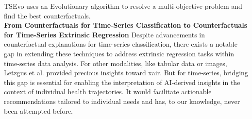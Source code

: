  TSEvo \cite{hollig_tsevo_2022} uses an Evolutionary algorithm to resolve a multi-objective problem and find the best counterfactuals. \\

\textbf{From Counterfactuals for Time-Series Classification to Counterfactuals for Time-Series Extrinsic Regression} Despite advancements in counterfactual explanations for time-series classification, there exists a notable gap in extending these techniques to address extrinsic regression tasks within time-series data analysis. For other modalities, like tabular data or images, Letzgus et al. \cite{letzgus_toward_2022} provided precious insights toward \acrfull{xair}. But for time-series, bridging this gap is essential for enabling the interpretation of AI-derived insights in the context of individual health trajectories. It would facilitate actionable recommendations tailored to individual needs and has, to our knowledge, never been attempted before.

